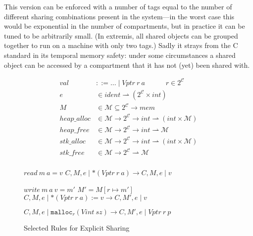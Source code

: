 This version can be enforced with a number of tags equal to the number of different
sharing combinations present in the system---in the worst case this would be
exponential in the number of compartments, but in practice it can be tuned to be
arbitrarily small. (In extremis, all shared objects can be grouped together to run
on a machine with only two tags.) Sadly it strays from the C standard in its
temporal memory safety: under some circumstances a shared object can be accessed
by a compartment that it has not (yet) been shared with.


\begin{figure}
  \scriptsize
  \begin{minipage}{0.45\textwidth}
    \[\begin{aligned}
    \mathit{val} & ::= \ldots \mid \mathit{Vptr} ~ r ~ a \hspace{3em} r \in 2^{\mathcal{C}} \\
    e & \in \mathit{ident} \rightharpoonup (2^{\mathcal{C}} \times \mathit{int}) \\
    M & \in \mathcal{M} \subseteq 2^{\mathcal{C}} \rightarrow \mathit{mem} \\
    \mathit{heap\_alloc} & \in \mathcal{M} \rightarrow 2^{\mathcal{C}} \rightarrow
    \mathit{int} \rightharpoonup (\mathit{int} \times \mathcal{M}) \\
    \mathit{heap\_free} & \in \mathcal{M} \rightarrow 2^{\mathcal{C}} \rightarrow
    \mathit{int} \rightharpoonup \mathcal{M} \\
    \mathit{stk\_alloc} & \in \mathcal{M} \rightarrow 2^{\mathcal{C}} \rightarrow
    \mathit{int} \rightharpoonup (\mathit{int} \times \mathcal{M}) \\
    \mathit{stk\_free} & \in \mathcal{M} \rightarrow 2^{\mathcal{C}}
    \rightharpoonup \mathcal{M} \\
    \end{aligned}\]
  \end{minipage}
  \begin{minipage}{0.55\textwidth}
                {\(\mathit{read} ~ m ~ a = v\)}
                {\(C,M,e \mid *(\mathit{Vptr} ~ r ~ a)
                  \longrightarrow C,M,e \mid v\)}

                  {\(\mathit{write} ~ m ~ a ~ v = m'\)}
                  {\(M' = M[r \mapsto m']\)}
                  {\(C,M,e \mid *(\mathit{Vptr} ~ r ~ a) := v
                    \longrightarrow C,M',e \mid v\)}

             {\(C,M,e \mid \mathtt{malloc}_r(\mathit{Vint} ~ sz)
               \longrightarrow C,M',e \mid \mathit{Vptr} ~ r ~ p\)}

  \end{minipage}

  \caption{Selected Rules for Explicit Sharing}
  \label{ch5:fig:powerset}
\end{figure}
